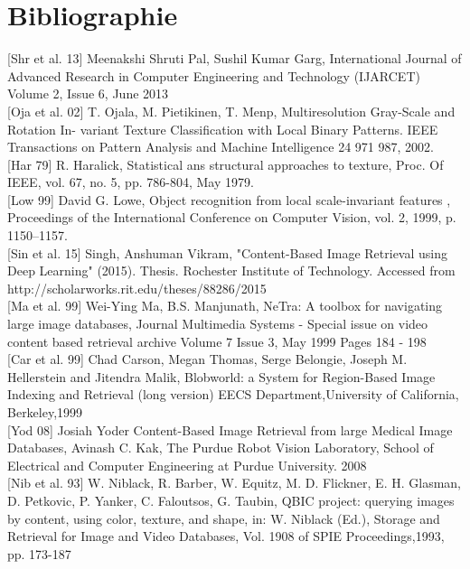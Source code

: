 
\chapter*{Bibliographie} %

[Shr et al. 13] Meenakshi Shruti Pal, Sushil Kumar Garg,  International Journal of Advanced Research in Computer Engineering and Technology (IJARCET) Volume 2, Issue 6, June 2013\\

[Oja et al. 02] T. Ojala, M. Pietikinen, T. Menp, Multiresolution Gray-Scale and Rotation In-
variant Texture Classification with Local Binary Patterns. IEEE Transactions on
Pattern Analysis and Machine Intelligence 24 971 987, 2002.\\

[Har 79] R. Haralick, Statistical ans structural approaches to texture, Proc. Of IEEE, vol.
67, no. 5, pp. 786-804, May 1979.\\

[Low 99] David G. Lowe, Object recognition from local scale-invariant features , Proceedings of the International Conference on Computer Vision, vol. 2,‎ 1999, p. 1150–1157.\\

[Sin et al. 15] Singh, Anshuman Vikram, "Content-Based Image Retrieval using Deep Learning" (2015). Thesis. Rochester Institute of Technology.  Accessed from http://scholarworks.rit.edu/theses/88286/2015\\

[Ma et al. 99] Wei-Ying Ma, B.S. Manjunath, NeTra: A toolbox for navigating large image databases, Journal
Multimedia Systems - Special issue on video content based retrieval archive Volume 7 Issue 3, May 1999 Pages 184 - 198 \\

[Car et al. 99] Chad Carson, Megan Thomas, Serge Belongie, Joseph M. Hellerstein and Jitendra Malik, Blobworld: a System for Region-Based Image Indexing and Retrieval (long version) EECS Department,University of California, Berkeley,1999\\

[Yod 08] Josiah Yoder Content-Based Image Retrieval from large Medical Image Databases, Avinash C. Kak, The Purdue Robot Vision Laboratory, School of Electrical and Computer Engineering at Purdue University. 2008\\

[Nib et al. 93] W. Niblack, R. Barber, W. Equitz, M. D. Flickner, E. H. Glasman, D. Petkovic, P. Yanker, C. Faloutsos, G. Taubin, QBIC project: querying images by content, using color, texture, and shape, in: W. Niblack (Ed.), Storage and Retrieval for Image and Video Databases, Vol. 1908 of SPIE Proceedings,1993, pp. 173-187\\

